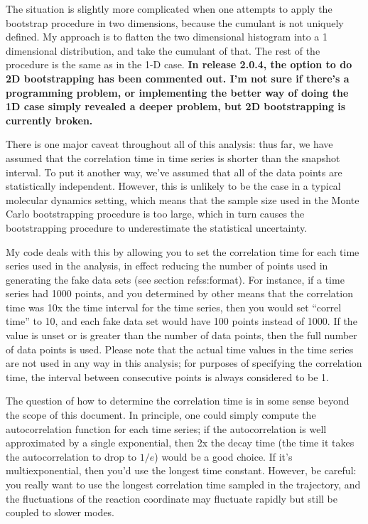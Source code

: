 \documentclass[12pt]{article}
\begin{document}
The situation is slightly more complicated when one attempts to apply the
bootstrap procedure in two dimensions, because the cumulant is not uniquely
defined.  My approach is to flatten the two dimensional histogram into a 1
dimensional distribution, and take the cumulant of that.  The rest of the
procedure is the same as in the 1-D case.  {\bf In release 2.0.4, the option
to do 2D bootstrapping has been commented out.  I'm not sure if there's a
programming problem, or implementing the better way of doing the 1D case
simply revealed a deeper problem, but 2D bootstrapping is currently broken.}

There is one major caveat throughout all of this analysis: thus far, we have
assumed that the correlation time in time series is shorter than the snapshot
interval.  To put it another way, we've assumed that all of the data points
are statistically independent.  However, this is unlikely to be the case in a
typical molecular dynamics setting, which means that the sample size used in
the Monte Carlo bootstrapping procedure is too large, which in turn causes
the bootstrapping procedure to underestimate the statistical uncertainty.

My code deals with this by allowing you to set the correlation time for each
time series used in the analysis, in effect reducing the number of points
used in generating the fake data sets (see section ref{ss:format}).  For
instance, if a time series had 1000 points, and you determined by other means
that the correlation time was 10x the time interval for the time series, then
you would set ``correl time'' to 10, and each fake data set would have 100
points instead of 1000.  If the value is unset or is greater than the number
of data points, then the full number of data points is used.  Please note
that the actual time values in the time series are not used in any way in
this analysis; for purposes of specifying the correlation time, the interval
between consecutive points is always considered to be 1.

The question of how to determine the correlation time is in some sense beyond
the scope of this document.  In principle, one could simply compute the
autocorrelation function for each time series; if the autocorrelation is well
approximated by a single exponential, then 2x the decay time (the time it
takes the autocorrelation to drop to $1/e$) would be a good choice.  If it's
multiexponential, then you'd use the longest time constant.  However, be
careful: you really want to use the longest correlation time sampled in the
trajectory, and the fluctuations of the reaction coordinate may fluctuate
rapidly but still be coupled to slower modes.
\end{document}
